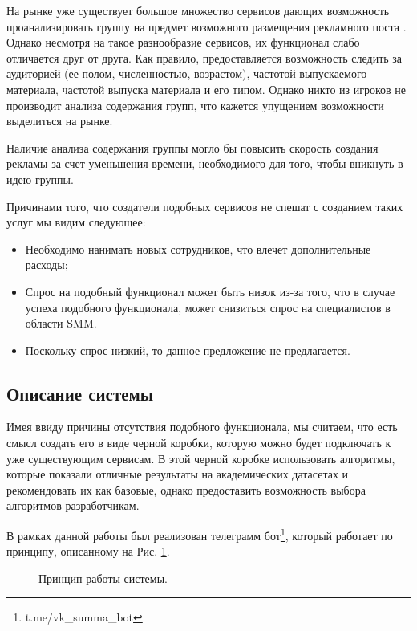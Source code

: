 \documentclass[14pt]{matmex-diploma-custom}
\begin{document}
На рынке уже существует большое множество сервисов дающих возможность проанализировать группу
на предмет возможного размещения рекламного поста \cite{smmpub2019}. Однако несмотря на
такое разнообразие сервисов, их функционал слабо отличается друг от друга. Как правило, предоставляется
возможность следить за аудиторией (ее полом, численностью, возрастом), частотой выпускаемого материала,
частотой выпуска материала и его типом. Однако никто из игроков не производит анализа содержания групп,
что кажется упущением возможности выделиться на рынке.

Наличие анализа содержания группы могло бы повысить скорость создания рекламы за счет уменьшения времени, необходимого для того, чтобы вникнуть в идею группы.

Причинами того, что создатели подобных сервисов не спешат с созданием таких услуг мы видим следующее:
\begin{itemize}
  \item Необходимо нанимать новых сотрудников, что влечет дополнительные расходы;
  \item Спрос на подобный функционал может быть низок из-за того, что в случае успеха подобного функционала, может снизиться спрос на специалистов в области SMM.
  \item Поскольку спрос низкий, то данное предложение не предлагается.
\end{itemize}

\subsection{Описание системы}

Имея ввиду причины отсутствия подобного функционала, мы считаем, что есть смысл создать его в виде
черной коробки, которую можно будет подключать к уже существующим сервисам. В этой черной коробке
использовать алгоритмы, которые показали отличные результаты на академических датасетах и рекомендовать их как базовые, однако предоставить возможность выбора алгоритмов разработчикам.

В рамках данной работы был реализован телеграмм бот\footnote{t.me/vk\_summa\_bot}, который работает по принципу, описанному на Рис. \ref{app_story}.

\begin{figure}[ht]
\begin{center}


\caption{
\label{app_story} Принцип работы системы.
        }
\end {center}
\end {figure}
\end{document}
